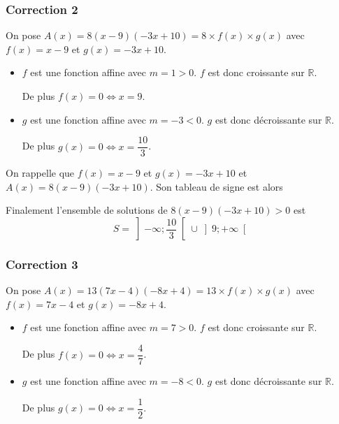 \documentclass[15pt, mathserif]{beamer}
\begin{document}
\begin{frame}
\vspace{-10mm}
	\frametitle{Correction 2}
On pose $A(x) = 8(x-9)(-3x+10) = 8\times f(x) \times g(x)$ avec $f(x) = x-9$ et $g(x) = -3x+10$.

\begin{itemize}
	\item $f$ est une fonction affine avec $m =1>0$. $f$ est donc croissante sur $\mathbb{R}$.

	 De plus $f(x) = 0 \Leftrightarrow x = 9$.
	\item $g$ est une fonction affine avec $m =-3<0$. $g$ est donc décroissante sur $\mathbb{R}$.

	 De plus $g(x) = 0 \Leftrightarrow x = \dfrac{10}{3}$.
\end{itemize}

 \end{frame}


\begin{frame}On rappelle que $f(x) = x-9$ et $g(x) = -3x+10$ et $A(x) = 8(x-9)(-3x+10)$. Son tableau de signe est alors 

\medskip \hfil
{}

 Finalement l'ensemble de solutions de $8(x-9)(-3x+10)>0$ est\[S = \left]-\infty;\dfrac{10}{3}\right[\cup\left]9;+\infty\right[\]

\end{frame}


\begin{frame}
\vspace{-10mm}
	\frametitle{Correction 3}
On pose $A(x) = 13(7x-4)(-8x+4) = 13\times f(x) \times g(x)$ avec $f(x) = 7x-4$ et $g(x) = -8x+4$.

\begin{itemize}
	\item $f$ est une fonction affine avec $m =7>0$. $f$ est donc croissante sur $\mathbb{R}$.

	 De plus $f(x) = 0 \Leftrightarrow x = \dfrac{4}{7}$.
	\item $g$ est une fonction affine avec $m =-8<0$. $g$ est donc décroissante sur $\mathbb{R}$.

	 De plus $g(x) = 0 \Leftrightarrow x = \dfrac{1}{2}$.
\end{itemize}

 \end{frame}
\end{document}
